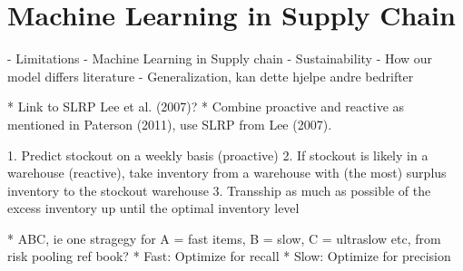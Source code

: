 \documentclass[../../main.tex]{subfiles}
\begin{document}

\section{Machine Learning in Supply Chain}

- Limitations
- Machine Learning in Supply chain
- Sustainability
- How our model differs literature
- Generalization, kan dette hjelpe andre bedrifter

* Link to SLRP Lee et al. (2007)?
  * Combine proactive and reactive as mentioned in Paterson (2011), use SLRP from Lee (2007).

1.	Predict stockout on a weekly basis (proactive)
2.	If stockout is likely in a warehouse (reactive), take inventory from a warehouse with (the most) surplus inventory to the stockout warehouse
3.	Transship as much as possible of the excess inventory up until the optimal inventory level

*	ABC, ie one stragegy for A = fast items, B = slow, C = ultraslow etc, from risk pooling ref book? 
  * Fast: Optimize for recall
  * Slow: Optimize for precision


\end{document}
